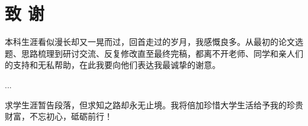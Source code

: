 \documentclass[openany,oneside]{book}
\begin{document}
%
\clearpage
{}
{}
\nocite{*} %

\chapter*{致 \qquad 谢}
\thispagestyle{empty}
本科生涯看似漫长却又一晃而过，回首走过的岁月，我感慨良多。从最初的论文选题、思路梳理到研讨交流、反复修改直至最终完稿，都离不开老师、同学和亲人们的支持和无私帮助，在此我要向他们表达我最诚挚的谢意。

...

求学生涯暂告段落，但求知之路却永无止境。我将倍加珍惜大学生活给予我的珍贵财富，不忘初心，砥砺前行！
\end{document}
